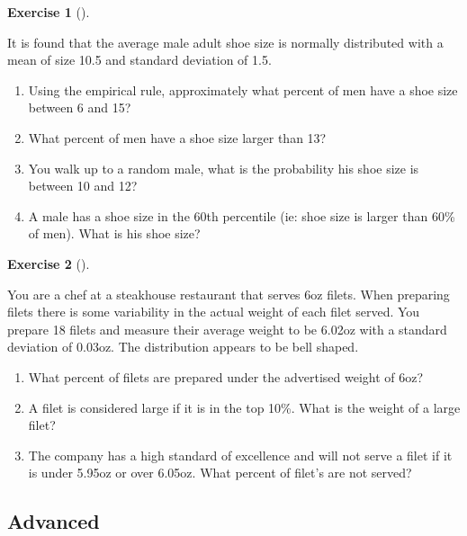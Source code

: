 \documentclass[
  letterpaper,
  DIV=11,
  numbers=noendperiod]{scrreprt}
\providecommand{\tightlist}{%
  \setlength{\itemsep}{0pt}\setlength{\parskip}{0pt}}\usepackage{longtable,booktabs,array}
\theoremstyle{definition}
\newtheorem{exercise}{Exercise}[chapter]
\theoremstyle{remark}
\begin{document}
\begin{exercise}[]\protect\hypertarget{exr-ch09-app1}{}\label{exr-ch09-app1}

It is found that the average male adult shoe size is normally
distributed with a mean of size 10.5 and standard deviation of 1.5.

\begin{enumerate}
\def\labelenumi{\alph{enumi})}
\tightlist
\item
  Using the empirical rule, approximately what percent of men have a
  shoe size between 6 and 15?
\item
  What percent of men have a shoe size larger than 13?
\item
  You walk up to a random male, what is the probability his shoe size is
  between 10 and 12?
\item
  A male has a shoe size in the 60th percentile (ie: shoe size is larger
  than 60\% of men). What is his shoe size?
\end{enumerate}

\end{exercise}

\begin{exercise}[]\protect\hypertarget{exr-ch09-app2}{}\label{exr-ch09-app2}

You are a chef at a steakhouse restaurant that serves 6oz filets. When
preparing filets there is some variability in the actual weight of each
filet served. You prepare 18 filets and measure their average weight to
be 6.02oz with a standard deviation of 0.03oz. The distribution appears
to be bell shaped.

\begin{enumerate}
\def\labelenumi{\alph{enumi})}
\tightlist
\item
  What percent of filets are prepared under the advertised weight of
  6oz?
\item
  A filet is considered large if it is in the top 10\%. What is the
  weight of a large filet?
\item
  The company has a high standard of excellence and will not serve a
  filet if it is under 5.95oz or over 6.05oz. What percent of filet's
  are not served?
\end{enumerate}

\end{exercise}

\hypertarget{sec-ex09-advanced}{%
\subsection{Advanced}\label{sec-ex09-advanced}}
\end{document}
